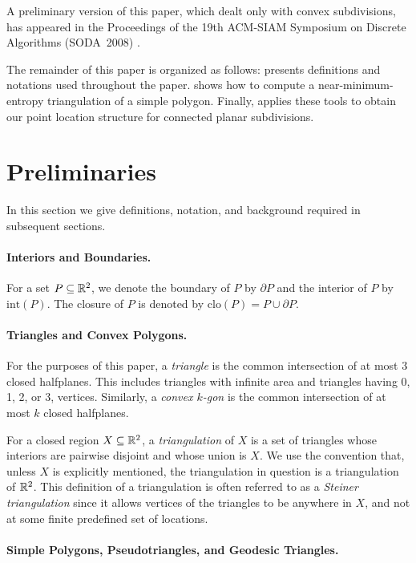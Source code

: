 \documentclass[acmtalg]{acmsmall}
\newcommand{\boundary}{\partial}
\newcommand{\closure}{\mathrm{clo}}
\newcommand{\interior}{\mathrm{int}}
\begin{document}
A preliminary version of this paper, which dealt only with convex
subdivisions, has appeared in the Proceedings of the 19th ACM-SIAM
Symposium on Discrete Algorithms (SODA~2008) \cite{cdilm08}.

The remainder of this paper is organized as follows:  
presents definitions and notations used throughout the paper.
 shows how to compute a near-minimum-entropy
triangulation of a simple polygon.  Finally, 
applies these tools to obtain our point location structure for
connected planar subdivisions.


\section{Preliminaries}

In this section we give definitions, notation, and background
required in subsequent sections.

\paragraph{Interiors and Boundaries.}
For a set $P\subseteq \mathbb{R}^2$, we denote the boundary of $P$ by $\boundary P$
and the interior of $P$ by $\interior(P)$.  The closure of $P$
is denoted by $\closure(P) = P\cup{\boundary P}$.


\paragraph{Triangles and Convex Polygons.}  For the purposes of this
paper, a \emph{triangle} is the common intersection of at most 3
closed halfplanes.  This includes triangles with infinite area and
triangles having 0, 1, 2, or 3, vertices. Similarly, a \emph{convex
$k$-gon} is the common intersection of at most $k$ closed halfplanes.

For a closed region $X\subseteq \mathbb{R}^2$, a \emph{triangulation} of $X$
is a set of triangles whose interiors are pairwise disjoint and whose
union is $X$.  We use the convention that, unless $X$ is explicitly
mentioned, the triangulation in question is a triangulation of $\mathbb{R}^2$.
This definition of a triangulation is often referred to as a
\emph{Steiner triangulation} since it allows vertices of the triangles
to be anywhere in $X$, and not at some finite predefined set of
locations.

\paragraph{Simple Polygons, Pseudotriangles, and Geodesic Triangles.}
\end{document}
